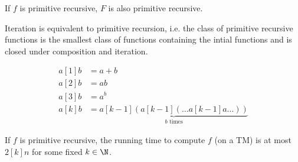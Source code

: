 \documentclass{article}
\begin{document}
\begin{theorem}
    If \(f\) is primitive recursive,
    \(F\) is also primitive recursive.
\end{theorem}
\begin{theorem}
    Iteration is equivalent to primitive recursion,
    i.e. the class of primitive recursive functions
    is the smallest class of functions containing
    the intial functions and is closed under
    composition and iteration. 
\end{theorem}
\begin{definition}[Hyperoperation]
    \begin{align*}
        a[1]b &= a + b \\
        a[2]b &= ab \\
        a[3]b &= a^b \\
        a[k]b &= \underbrace{ a[k-1]( a[k-1] ( \ldots a[k-1]a \ldots ) ) }_{b \text{ times}}
    \end{align*}
\end{definition}
\begin{theorem}
    If \(f\) is primitive recursive,
    the running time to compute \(f\) (on a TM)
    is at most \(2[k]n\) for some fixed \(k\in\N\).
\end{theorem}
\end{document}
